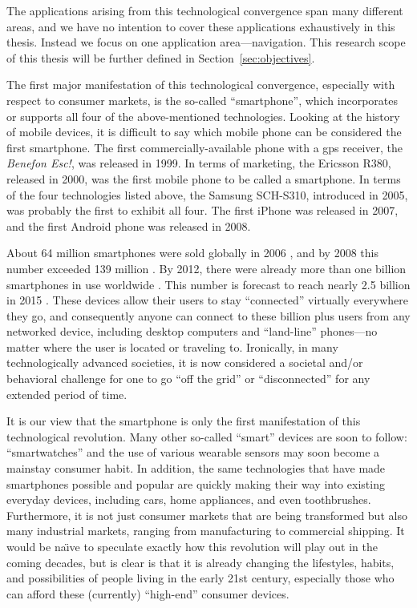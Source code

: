 The applications arising from this technological convergence span many different areas, and we have no intention to cover these applications exhaustively in this thesis. Instead we focus on one application area---navigation. This research scope of this thesis will be further defined in Section~\ref{sec:objectives}.

The first major manifestation of this technological convergence, especially with respect to consumer markets, is the so-called ``smartphone'', which incorporates or supports all four of the above-mentioned technologies. Looking at the history of mobile devices, it is difficult to say which mobile phone can be considered the first smartphone. The first commercially-available phone with a \gls{gps} receiver, the \emph{Benefon Esc!}, was released in 1999. In terms of marketing, the Ericsson R380, released in 2000, was the first mobile phone to be called a smartphone. In terms of the four technologies listed above, the Samsung SCH-S310, introduced in 2005, was probably the first to exhibit all four. The first iPhone was released in 2007, and the first Android phone was released in 2008.

About 64 million smartphones were sold globally in 2006 \cite{canalys_2007}, and by 2008 this number exceeded 139 million \cite{Gartner2009}. By 2012, there were already more than one billion smartphones in use worldwide \cite{Mawston2012}. This number is forecast to reach nearly 2.5 billion in 2015 \cite{KoreaTimes2014}. These devices allow their users to stay ``connected'' virtually everywhere they go, and consequently anyone can connect to these billion plus users from any networked device, including desktop computers and ``land-line'' phones---no matter where the user is located or traveling to. Ironically, in many technologically advanced societies, it is now considered a societal and/or behavioral challenge for one to go ``off the grid'' or ``disconnected'' for any extended period of time.

It is our view that the smartphone is only the first manifestation of this technological revolution. Many other so-called ``smart'' devices are soon to follow: ``smartwatches'' and the use  of various wearable sensors may soon become a mainstay consumer habit. In addition, the same technologies that have made smartphones possible and popular are quickly making their way into existing everyday devices, including cars, home appliances, and even toothbrushes. Furthermore, it is not just consumer markets that are being transformed but also many industrial markets, ranging from manufacturing to commercial shipping. It would be  na\"{\i}ve to speculate exactly how this revolution will play out in the coming decades, but is clear is that it is already changing the lifestyles, habits, and possibilities of people living in the early 21st century, especially those who can afford these (currently) ``high-end'' consumer devices.

